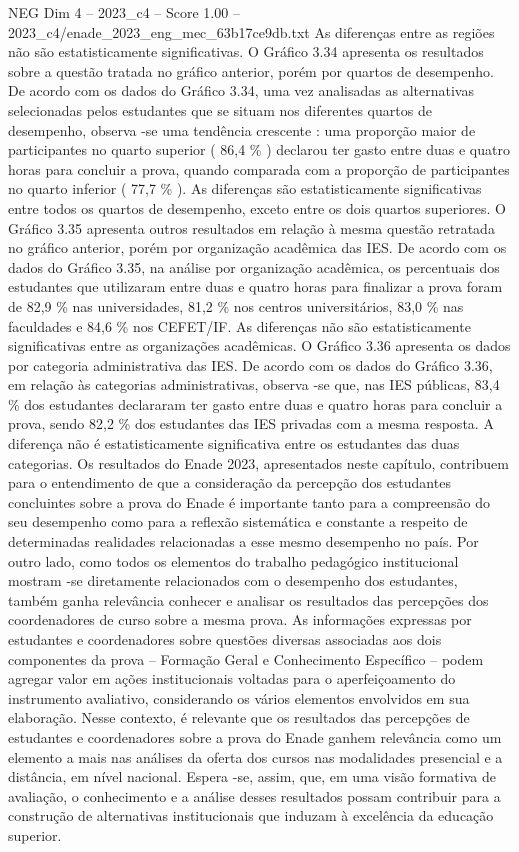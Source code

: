 \begin{textsample}{NEG Dim 4 – 2023\_c4 – Score 1.00 – 2023\_c4/enade\_2023\_eng\_mec\_63b17ce9db.txt}
As diferenças entre as regiões não são estatisticamente significativas.
O Gráfico 3.34 apresenta os resultados sobre a questão tratada no gráfico anterior, porém por quartos de desempenho.
De acordo com os dados do Gráfico 3.34, uma vez analisadas as alternativas selecionadas pelos estudantes que se situam nos diferentes quartos de desempenho, observa -se uma tendência crescente : uma proporção maior de participantes no quarto superior ( 86,4 \% ) declarou ter gasto entre duas e quatro horas para concluir a prova, quando comparada com a proporção de participantes no quarto inferior ( 77,7 \% ).
As diferenças são estatisticamente significativas entre todos os quartos de desempenho, exceto entre os dois quartos superiores.
O Gráfico 3.35 apresenta outros resultados em relação à mesma questão retratada no gráfico anterior, porém por organização acadêmica das IES.
De acordo com os dados do Gráfico 3.35, na análise por organização acadêmica, os percentuais dos estudantes que utilizaram entre duas e quatro horas para finalizar a prova foram de 82,9 \% nas universidades, 81,2 \% nos centros universitários, 83,0 \% nas faculdades e 84,6 \% nos CEFET/IF.
As diferenças não são estatisticamente significativas entre as organizações acadêmicas.
O Gráfico 3.36 apresenta os dados por categoria administrativa das IES.
De acordo com os dados do Gráfico 3.36, em relação às categorias administrativas, observa -se que, nas IES públicas, 83,4 \% dos estudantes declararam ter gasto entre duas e quatro horas para concluir a prova, sendo 82,2 \% dos estudantes das IES privadas com a mesma resposta.
A diferença não é estatisticamente significativa entre os estudantes das duas categorias.
Os resultados do Enade 2023, apresentados neste capítulo, contribuem para o entendimento de que a consideração da percepção dos estudantes concluintes sobre a prova do Enade é importante tanto para a compreensão do seu desempenho como para a reflexão sistemática e constante a respeito de determinadas realidades relacionadas a esse mesmo desempenho no país.
Por outro lado, como todos os elementos do trabalho pedagógico institucional mostram -se diretamente relacionados com o desempenho dos estudantes, também ganha relevância conhecer e analisar os resultados das percepções dos coordenadores de curso sobre a mesma prova.
As informações expressas por estudantes e coordenadores sobre questões diversas associadas aos dois componentes da prova – Formação Geral e Conhecimento Específico – podem agregar valor em ações institucionais voltadas para o aperfeiçoamento do instrumento avaliativo, considerando os vários elementos envolvidos em sua elaboração.
Nesse contexto, é relevante que os resultados das percepções de estudantes e coordenadores sobre a prova do Enade ganhem relevância como um elemento a mais nas análises da oferta dos cursos nas modalidades presencial e a distância, em nível nacional.
Espera -se, assim, que, em uma visão formativa de avaliação, o conhecimento e a análise desses resultados possam contribuir para a construção de alternativas institucionais que induzam à excelência da educação superior.

\end{textsample}
